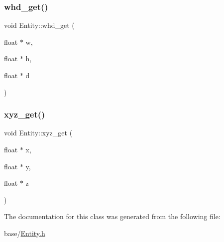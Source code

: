 \mbox{\label{classEntity_a7172fa9327ac448a2d80bce33a2be256}} 
\subsubsection{\texorpdfstring{whd\+\_\+get()}{whd\_get()}}
{\footnotesize\ttfamily void Entity\+::whd\+\_\+get (\begin{DoxyParamCaption}\item[{float $\ast$}]{w,  }\item[{float $\ast$}]{h,  }\item[{float $\ast$}]{d }\end{DoxyParamCaption})}

\mbox{\label{classEntity_a9e99a54fce35facb3410b683e41d80e1}} 
\subsubsection{\texorpdfstring{xyz\+\_\+get()}{xyz\_get()}}
{\footnotesize\ttfamily void Entity\+::xyz\+\_\+get (\begin{DoxyParamCaption}\item[{float $\ast$}]{x,  }\item[{float $\ast$}]{y,  }\item[{float $\ast$}]{z }\end{DoxyParamCaption})}



The documentation for this class was generated from the following file\+:\begin{DoxyCompactItemize}
\item 
base/\mbox{\hyperlink{Entity_8h}{Entity.\+h}}\end{DoxyCompactItemize}
